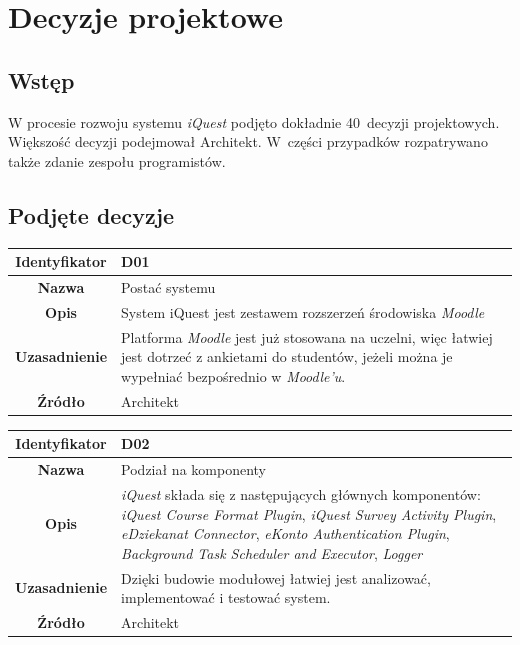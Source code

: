 \section{Decyzje projektowe}
\label{Chapter55}

\subsection{Wstęp}
\label{Chapter551}

W procesie rozwoju systemu \textit{iQuest} podjęto dokładnie 40~decyzji projektowych. Większość decyzji podejmował Architekt. W~części przypadków rozpatrywano także zdanie zespołu programistów.

\subsection{Podjęte decyzje}
\label{Chapter552}

\begin{table}[H]
\centering
\begin{tabular}{ | >{\bfseries}c | p{11cm} | }
\hline
%
Identyfikator & D01 \\ \hline
Nazwa & Postać systemu \\ \hline
Opis & System iQuest jest zestawem rozszerzeń środowiska \textit{Moodle} \\ \hline
Uzasadnienie & Platforma \textit{Moodle} jest już stosowana na uczelni, więc łatwiej jest dotrzeć z ankietami do studentów, jeżeli można je wypełniać bezpośrednio w \textit{Moodle'u}. \\ \hline
Źródło & Architekt \\ \hline
%
\end{tabular}
\end{table}

\begin{table}[H]
\centering
\begin{tabular}{ | >{\bfseries}c | p{11cm} | }
\hline
%
Identyfikator & D02 \\ \hline
Nazwa & Podział na komponenty  \\ \hline
Opis & \textit{iQuest} składa się z następujących głównych komponentów: \textit{iQuest Course Format Plugin}, \textit{iQuest Survey Activity Plugin}, \textit{eDziekanat Connector}, \textit{eKonto Authentication Plugin}, \textit{Background Task Scheduler and Executor}, \textit{Logger}  \\ \hline
Uzasadnienie & Dzięki budowie modułowej łatwiej jest analizować, implementować i testować system. \\ \hline
Źródło & Architekt \\ \hline
%
\end{tabular}
\end{table}

